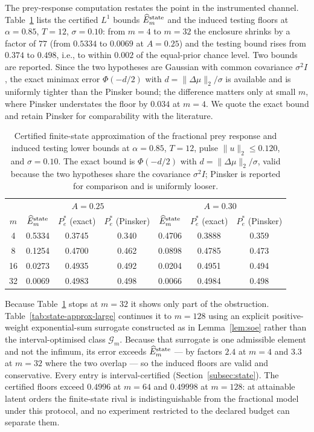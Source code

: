 The prey-response computation restates the point in the instrumented channel. Table~\ref{tab:state-approx} lists the certified $L^1$ bounds $\widehat E_m^{\rm state}$ and the induced testing floors at $\alpha=0.85$, $T=12$, $\sigma=0.10$: from $m=4$ to $m=32$ the enclosure shrinks by a factor of $77$ (from $0.5334$ to $0.0069$ at $A=0.25$) and the testing bound rises from $0.374$ to $0.498$, i.e., to within $0.002$ of the equal-prior chance level. Two bounds are reported. Since the two hypotheses are Gaussian with common covariance $\sigma^2I$, the exact minimax error $\Phi(-d/2)$ with $d=\|\Delta\mu\|_2/\sigma$ is available and is uniformly tighter than the Pinsker bound; the difference matters only at small $m$, where Pinsker understates the floor by $0.034$ at $m=4$. We quote the exact bound and retain Pinsker for comparability with the literature.

\begin{table}[htbp]
\centering
\caption{Certified finite-state approximation of the fractional prey response and induced testing lower bounds at $\alpha=0.85$, $T=12$, pulse $\|u\|_2\le0.120$, and $\sigma=0.10$. The exact bound is $\Phi(-d/2)$ with $d=\|\Delta\mu\|_2/\sigma$, valid because the two hypotheses share the covariance $\sigma^2I$; Pinsker is reported for comparison and is uniformly looser.}
\label{tab:state-approx}
\small
\begin{tabular}{ccccccc}
\hline
& \multicolumn{3}{c}{$A=0.25$} & \multicolumn{3}{c}{$A=0.30$}\\
$m$ & $\widehat E_m^{\rm state}$ & $P_e^*$ (exact) & $P_e^*$ (Pinsker) & $\widehat E_m^{\rm state}$ & $P_e^*$ (exact) & $P_e^*$ (Pinsker)\\
\hline
4  & 0.5334 & 0.3745 & 0.340 & 0.4706 & 0.3888 & 0.359\\
8  & 0.1254 & 0.4700 & 0.462 & 0.0898 & 0.4785 & 0.473\\
16 & 0.0273 & 0.4935 & 0.492 & 0.0204 & 0.4951 & 0.494\\
32 & 0.0069 & 0.4983 & 0.498 & 0.0066 & 0.4984 & 0.498\\
\hline
\end{tabular}
\end{table}

Because Table~\ref{tab:state-approx} stops at $m=32$ it shows only part of the obstruction. Table~\ref{tab:state-approx-large} continues it to $m=128$ using an explicit positive-weight exponential-sum surrogate constructed as in Lemma~\ref{lem:soe} rather than the interval-optimised class $\mathcal G_m$. Because that surrogate is one admissible element and not the infimum, its error exceeds $\widehat E_m^{\rm state}$ --- by factors $2.4$ at $m=4$ and $3.3$ at $m=32$ where the two overlap --- so the induced floors are valid and conservative. Every entry is interval-certified (Section~\ref{subsec:state}). The certified floors exceed $0.4996$ at $m=64$ and $0.49998$ at $m=128$: at attainable latent orders the finite-state rival is indistinguishable from the fractional model under this protocol, and no experiment restricted to the declared budget can separate them.

